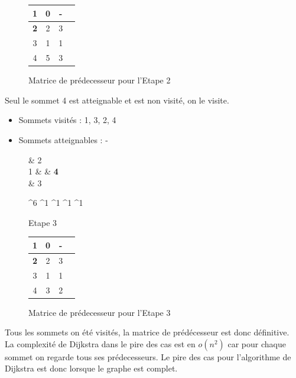 \documentclass[a4paper,12pt,final] {article}
\begin{document}
\begin{figure}[H]
\begin{center}
\begin{tabular}{|c|c|c|c|}
\hline
 1 & 0 & - \\
\hline
{\color{red} \bf 2} & 2 & 3 \\
\hline
3 & 1 & 1 \\
\hline
4 & 5 & 3 \\
\hline
\end{tabular}
\end{center}
\caption{Matrice de prédecesseur pour l'Etape 2}
\end{figure}
Seul le sommet 4 est atteignable et est non visité, on le visite.
\begin{itemize}
\item Sommets visités : 1, 3, 2, 4
\item Sommets atteignables : -
\end{itemize}
\begin{figure}[H]
 \centering
 \begin{psmatrix}[mnode=circle]
	    & 2\\
	1 &    & {\color{red} \bf 4}\\
	    &  3\\
\end{psmatrix}
	
	^{6}
	^{1}
	^{1}
	^{1}
	^{1}

  \caption{Etape 3}
\end{figure}

\begin{figure}[H]
\begin{center}
\begin{tabular}{|c|c|c|c|}
\hline
 1 & 0 & - \\
\hline
{\color{red} \bf 2} & 2 & 3 \\
\hline
3 & 1 & 1 \\
\hline
4 & 3 & 2 \\
\hline
\end{tabular}
\end{center}
\caption{Matrice de prédecesseur pour l'Etape 3}
\end{figure}
Tous les sommets on été visités, la matrice de prédécesseur est donc définitive.\\
La complexité de Dijkstra dans le pire des cas est en $o(n^{2})$ car pour chaque sommet on regarde tous ses prédecesseurs. Le pire des cas pour l'algorithme de Dijkstra est donc lorsque le graphe est complet.
\end{document}
